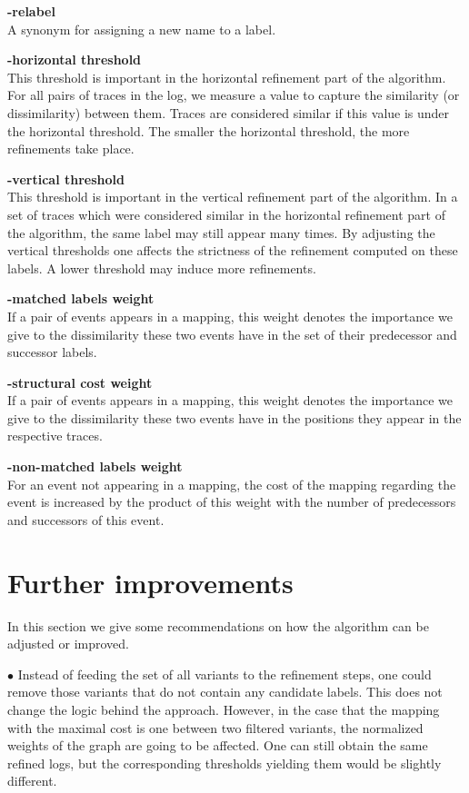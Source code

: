 \documentclass[notitlepage]{article}
\begin{document}
\textbf{-relabel}\\
A synonym for assigning a new name to a label.
\medskip

\textbf{-horizontal threshold}\\
This threshold is important in the horizontal refinement part of the algorithm.
For all pairs of traces in the log, we measure a value to capture the similarity (or dissimilarity) between them.
Traces are considered similar if this value is under the horizontal threshold.
The smaller the horizontal threshold, the more refinements take place.
\medskip

\textbf{-vertical threshold}\\
This threshold is important in the vertical refinement part of the algorithm.
In a set of traces which were considered similar in the horizontal refinement part of the algorithm, the same label may still appear many times.
By adjusting the vertical thresholds one affects the strictness of the refinement computed on these labels.
A lower threshold may induce more refinements.
\medskip

\textbf{-matched labels weight}\\
If a pair of events appears in a mapping, this weight denotes the importance we give to the dissimilarity these two events have in the set of their predecessor and successor labels.
\medskip

\textbf{-structural cost weight}\\
If a pair of events appears in a mapping, this weight denotes the importance we give to the dissimilarity these two events have in the positions they appear in the respective traces.
\medskip

\textbf{-non-matched labels weight}\\
For an event not appearing in a mapping, the cost of the mapping regarding the event is increased by the product of this weight with the number of predecessors and successors of this event.
\medskip


\section{Further improvements}
In this section we give some recommendations on how the algorithm can be adjusted or improved.
\medskip

$\bullet$
Instead of feeding the set of all variants to the refinement steps, one could remove those variants that do not contain any candidate labels.
This does not change the logic behind the approach.
However, in the case that the mapping with the maximal cost is one between two filtered variants, the normalized weights of the graph are going to be affected.
One can still obtain the same refined logs, but the corresponding thresholds yielding them would be slightly different.
\medskip
\end{document}
